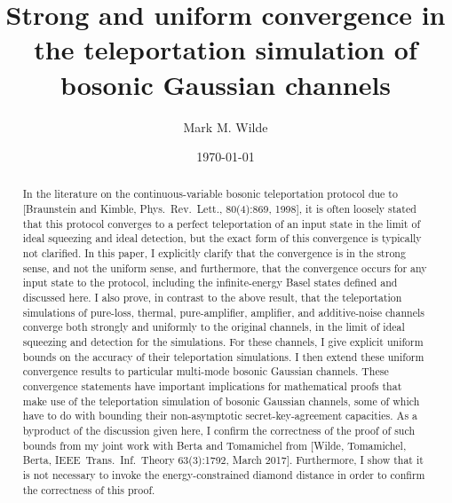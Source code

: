 \documentclass[apsrev,twocolumn]{revtex4-1}%
\begin{document}
\title{Strong and uniform convergence in the teleportation simulation of\\bosonic Gaussian channels}
\author{Mark M. Wilde}

\begin{abstract}
In the literature on the continuous-variable bosonic teleportation protocol
due to [Braunstein and Kimble, Phys.~Rev.~Lett., 80(4):869, 1998], it is often
loosely stated that this protocol converges to a perfect teleportation of an
input state in the limit of ideal squeezing and ideal detection, but the exact
form of this convergence is typically not clarified. In this paper, I
explicitly clarify that the convergence is in the strong sense, and not the
uniform sense, and furthermore, that the convergence occurs for any input
state to the protocol, including the infinite-energy Basel states defined and
discussed here. I also prove, in contrast to the above result, that the
teleportation simulations of pure-loss, thermal, pure-amplifier, amplifier,
and additive-noise channels converge both strongly and uniformly to the
original channels, in the limit of ideal squeezing and detection for the
simulations. For these channels, I give explicit uniform bounds on the
accuracy of their teleportation simulations. I then extend these uniform convergence results
to particular multi-mode bosonic Gaussian channels. These
convergence statements have important implications for mathematical proofs
that make use of the teleportation simulation of bosonic Gaussian channels,
some of which have to do with bounding their non-asymptotic
secret-key-agreement capacities. As a byproduct of the discussion given here,
I confirm the correctness of the proof of such bounds from my joint work with
Berta and Tomamichel from [Wilde, Tomamichel, Berta, IEEE~Trans.~Inf.~Theory
63(3):1792, March 2017].
Furthermore,
I show that it is not necessary to invoke the energy-constrained diamond
distance in order to confirm the correctness of this proof.

\end{abstract}
\date{\today}
\maketitle
\end{document}
